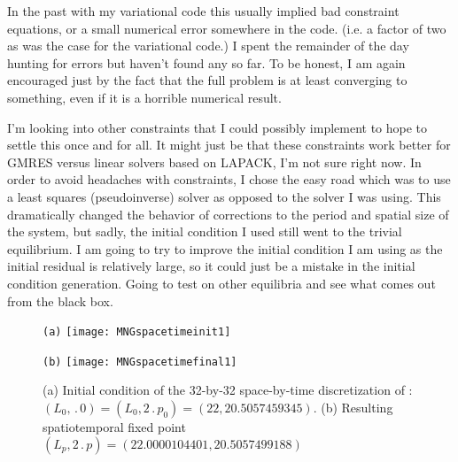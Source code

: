 In the past with my variational code this usually implied bad constraint equations, or a small
numerical error somewhere in the code. (i.e. a factor of two as was the case for the variational
code.) I spent the remainder of the day hunting for errors but haven't found any so far. To be honest,
I am again encouraged just by the fact that the full problem is at least converging to something, even
if it is a horrible numerical result.

I'm looking into other constraints that I could possibly implement to hope to settle this once and
for all. It might just be that these constraints work better for GMRES versus linear solvers based
on LAPACK, I'm not sure right now.
In order to avoid headaches with constraints, I chose the easy road which was to use a least
squares (pseudoinverse) solver as opposed to the solver I was using.
This dramatically changed the behavior of corrections to the period and spatial size of the
system, but sadly, the initial condition I used still went to the trivial equilibrium. I am
going to try to improve the initial condition I am using as the initial residual is relatively
large, so it could just be a mistake in the initial condition generation. Going to test
on other equilibria and see what comes out from the black box.




\begin{figure}[ht]
\begin{minipage}[height=.32\textheight]{.45\textwidth}
\centering \small{\texttt{(a)}}
\texttt{[image: MNGspacetimeinit1]}
\end{minipage}
\begin{minipage}[height=.32\textheight]{.45\textwidth}
\centering \small{\texttt{(b)}}
\texttt{[image: MNGspacetimefinal1]}
\end{minipage}
\caption{ \label{fig:MNGspacetime11}
(a) Initial condition of the 32-by-32 space-by-time discretization of :
$(L_0,\period{0}) = (L_0, 2\period{p_0})= (22,20.5057459345)$.
(b) Resulting spatiotemporal fixed point
$(L_p,2\period{p}) =  (22.0000104401, 20.5057499188)$
}
\end{figure}

